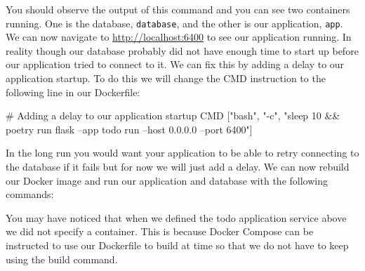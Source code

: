 \documentclass{csse4400}
\begin{document}
You should observe the output of this command and you can see two containers running.
One is the database, \texttt{database}, and the other is our application, \texttt{app}.
We can now navigate to \url{http://localhost:6400} to see our application running.
In reality though our database probably did not have enough time to start up before our application tried to connect to it.
We can fix this by adding a delay to our application startup.
To do this we will change the CMD instruction to the following line in our Dockerfile:

\begin{code}[language=docker,numbers=none]{}
# Adding a delay to our application startup
CMD ["bash", "-c", "sleep 10 && poetry run flask --app todo run --host 0.0.0.0 --port 6400"]
\end{code}

In the long run you would want your application to be able to retry connecting to the database if it fails but for now we will just add a delay.
We can now rebuild our Docker image and run our application and database with the following commands:


You may have noticed that when we defined the todo application service above we did not specify a container.
This is because Docker Compose can be instructed to use our Dockerfile to build at time so that we do not have to keep using the build command.






\end{document}
